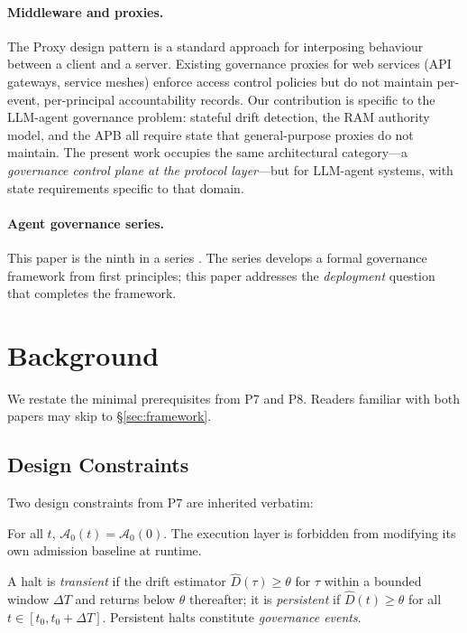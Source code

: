 \documentclass[11pt]{article}
\newcommand{\Azero}{\mathcal{A}_0}
\newcommand{\Dhat}{\widehat{D}}
\begin{document}
\paragraph{Middleware and proxies.}
The Proxy design pattern \citep{gamma1995design} is a standard approach
for interposing behaviour between a client and a server. Existing
governance proxies for web services (API gateways, service meshes)
enforce access control policies but do not maintain per-event,
per-principal accountability records. Our contribution is specific to
the LLM-agent governance problem: stateful drift detection, the RAM
authority model, and the APB all require state that general-purpose
proxies do not maintain. The present work occupies the same
architectural category---a \emph{governance control plane at the
protocol layer}---but for LLM-agent systems, with state requirements
specific to that domain.

\paragraph{Agent governance series.}
This paper is the ninth in a series
\citep{fernandez2026a,fernandez2026acp,fernandez2026iml,%
fernandez2026govstr,fernandez2026ram,fernandez2026opram,%
fernandez2026applied,fernandez2026ibg}. The series develops a formal
governance framework from first principles; this paper addresses the
\emph{deployment} question that completes the framework.

\section{Background}
\label{sec:background}

We restate the minimal prerequisites from P7 and P8. Readers familiar
with both papers may skip to \S\ref{sec:framework}.

\subsection{Design Constraints}

Two design constraints from P7 \citep{fernandez2026applied} are
inherited verbatim:

\begin{description}[leftmargin=2em, topsep=2pt]
  \item[DC.1 (Separation of Recalibration Authority).]
        For all $t$, $\Azero(t) = \Azero(0)$. The execution layer
        is forbidden from modifying its own admission baseline at
        runtime.
  \item[DC.2 (Drift Event Classification).]
        A halt is \emph{transient} if the drift estimator $\Dhat(\tau)
        \geq \theta$ for $\tau$ within a bounded window $\Delta T$ and
        returns below $\theta$ thereafter; it is \emph{persistent} if
        $\Dhat(t) \geq \theta$ for all $t \in [t_0, t_0 + \Delta T]$.
        Persistent halts constitute \emph{governance events}.
\end{description}
\end{document}
